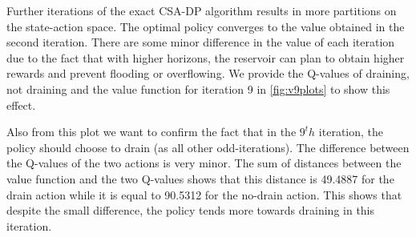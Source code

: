 Further iterations of the exact CSA-DP algorithm results in more partitions on the state-action space. The optimal policy converges to the value obtained in the second iteration. There are some minor difference in the value of each iteration due to the fact that with higher horizons, the reservoir can plan to obtain higher rewards and prevent flooding or overflowing. We provide the Q-values of draining, not draining and the value function for iteration 9 in \ref{fig:v9plots} to show this effect. 

Also from this plot we want to confirm the fact that in the $9^th$ iteration, the policy should choose to drain (as all other odd-iterations). The difference between the Q-values of the two actions is very minor. The sum of distances between the value function and the two Q-values shows that this distance is 49.4887 for the drain action while it is equal to 90.5312 for the no-drain action. This shows that despite the small difference, the policy tends more towards draining in this iteration. 
